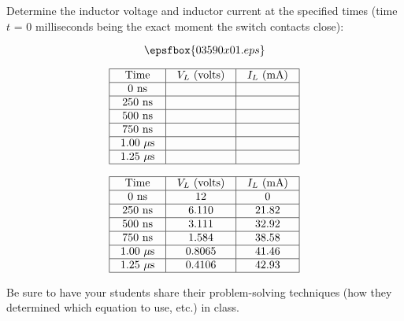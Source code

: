 

Determine the inductor voltage and inductor current at the specified times (time $t$ = 0 milliseconds being the exact moment the switch contacts close):

$$\epsfbox{03590x01.eps}$$


$$\vbox{\offinterlineskip
\halign{\strut
\vrule \quad\hfil # \ \hfil & 
\vrule \quad\hfil # \ \hfil & 
\vrule \quad\hfil # \ \hfil \vrule \cr
\noalign{\hrule}
%
Time & $V_L$ (volts) & $I_L$ (mA) \cr
%
\noalign{\hrule}
%
0 ns &  &  \cr
%
\noalign{\hrule}
%
250 ns &  &  \cr
%
\noalign{\hrule}
%
500 ns &  &  \cr
%
\noalign{\hrule}
%
750 ns &  &  \cr
%
\noalign{\hrule}
%
1.00 $\mu$s &  &  \cr
%
\noalign{\hrule}
%
1.25 $\mu$s &  &  \cr
%
\noalign{\hrule}
} %
}$$ %








$$\vbox{\offinterlineskip
\halign{\strut
\vrule \quad\hfil # \ \hfil & 
\vrule \quad\hfil # \ \hfil & 
\vrule \quad\hfil # \ \hfil \vrule \cr
\noalign{\hrule}
%
Time & $V_L$ (volts) & $I_L$ (mA) \cr
%
\noalign{\hrule}
%
0 ns & 12 & 0 \cr
%
\noalign{\hrule}
%
250 ns & 6.110 & 21.82 \cr
%
\noalign{\hrule}
%
500 ns & 3.111 & 32.92 \cr
%
\noalign{\hrule}
%
750 ns & 1.584 & 38.58 \cr
%
\noalign{\hrule}
%
1.00 $\mu$s & 0.8065 & 41.46 \cr
%
\noalign{\hrule}
%
1.25 $\mu$s & 0.4106 & 42.93 \cr
%
\noalign{\hrule}
} %
}$$ %







Be sure to have your students share their problem-solving techniques (how they determined which equation to use, etc.) in class.




